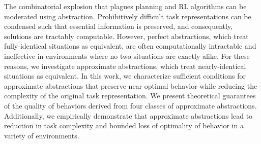 The combinatorial explosion that plagues planning and \ac{RL} algorithms can be moderated using abstraction. Prohibitively difficult task representations can be condensed such that essential information is preserved, and consequently, solutions are tractably computable. However, perfect abstractions, which treat fully-identical situations as equivalent, are often computationally intractable and ineffective in environments where no two situations are exactly alike. For these reasons, we investigate approximate abstractions, which treat nearly-identical situations as equivalent. In this work, we characterize sufficient conditions for approximate abstractions that preserve near optimal behavior while reducing the complexity of the original task representation. We present theoretical guarantees of the quality of behaviors derived from four classes of approximate abstractions. Additionally, we empirically demonstrate that approximate abstractions lead to reduction in task complexity and bounded loss of optimality of behavior in a variety of environments. %










%
%





